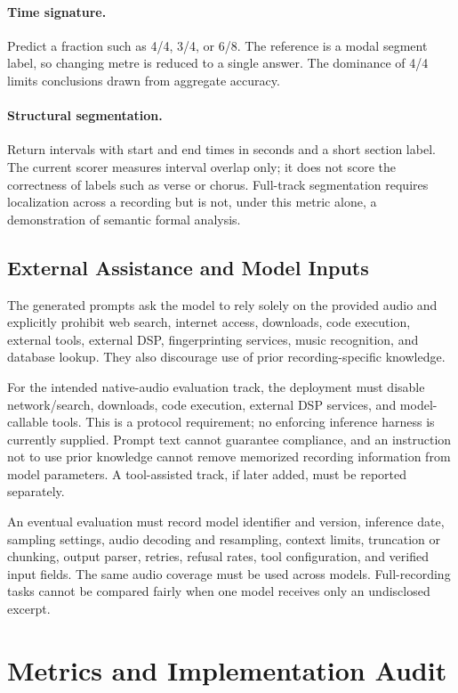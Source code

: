 \documentclass[11pt,a4paper]{article}
\begin{document}
\paragraph{Time signature.}
Predict a fraction such as 4/4, 3/4, or 6/8. The reference is a modal segment label, so changing metre is reduced to a single answer. The dominance of 4/4 limits conclusions drawn from aggregate accuracy.

\paragraph{Structural segmentation.}
Return intervals with start and end times in seconds and a short section label. The current scorer measures interval overlap only; it does not score the correctness of labels such as verse or chorus. Full-track segmentation requires localization across a recording but is not, under this metric alone, a demonstration of semantic formal analysis.

\subsection{External Assistance and Model Inputs}
\label{sec:tool-constraints}
The generated prompts ask the model to rely solely on the provided audio and explicitly prohibit web search, internet access, downloads, code execution, external tools, external DSP, fingerprinting services, music recognition, and database lookup. They also discourage use of prior recording-specific knowledge.

For the intended native-audio evaluation track, the deployment must disable network/search, downloads, code execution, external DSP services, and model-callable tools. This is a protocol requirement; no enforcing inference harness is currently supplied. Prompt text cannot guarantee compliance, and an instruction not to use prior knowledge cannot remove memorized recording information from model parameters. A tool-assisted track, if later added, must be reported separately.

An eventual evaluation must record model identifier and version, inference date, sampling settings, audio decoding and resampling, context limits, truncation or chunking, output parser, retries, refusal rates, tool configuration, and verified input fields. The same audio coverage must be used across models. Full-recording tasks cannot be compared fairly when one model receives only an undisclosed excerpt.

\section{Metrics and Implementation Audit}
\label{sec:metrics}
\end{document}
